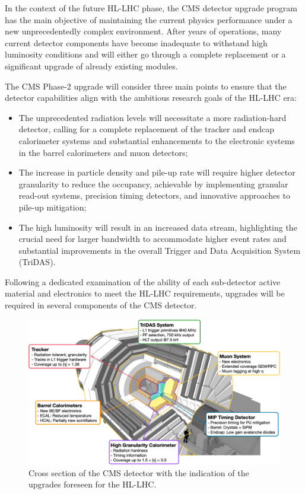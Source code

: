 In the context of the future HL-LHC phase, the CMS detector upgrade program has the main objective of maintaining the current physics performance under a new unprecedentedly complex environment. 
After years of operations, many current detector components have become inadequate to withstand high luminosity conditions and will either go through a complete replacement or a significant upgrade of already existing modules. 

The CMS Phase-2 upgrade will consider three main points to ensure that the detector capabilities align with the ambitious research goals of the HL-LHC era:
\begin{itemize}
    \item The unprecedented radiation levels will necessitate a more radiation-hard detector, calling for a complete replacement of the tracker and endcap calorimeter systems and substantial enhancements to the electronic systems in the barrel calorimeters and muon detectors;
    \item The increase in particle density and pile-up rate will require higher detector granularity to reduce the occupancy, achievable by implementing granular read-out systems, precision timing detectors, and innovative approaches to pile-up mitigation;
    \item The high luminosity will result in an increased data stream, highlighting the crucial need for larger bandwidth to accommodate higher event rates and substantial improvements in the overall Trigger and Data Acquisition System (TriDAS).
\end{itemize}

Following a dedicated examination of the ability of each sub-detector active material and electronics to meet the HL-LHC requirements, upgrades will be required in several components of the CMS detector.

\begin{figure}
    \centering
    \includegraphics[width=0.95\linewidth]{Figures/HGCAL/CMSUpgrades.pdf}
    \caption{Cross section of the CMS detector with the indication of the upgrades foreseen for the HL-LHC.}
    \label{fig:CMSUpgrade}
\end{figure}

